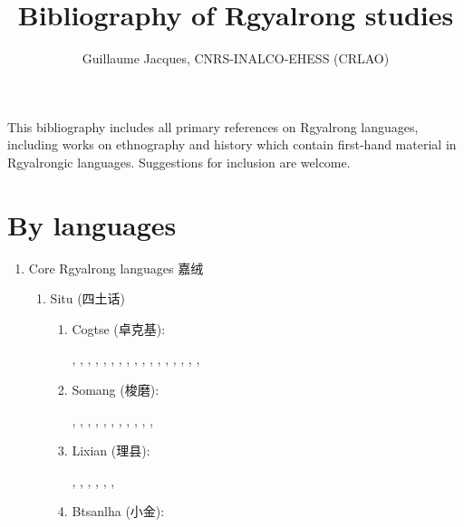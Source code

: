 \documentclass[oldfontcommands,oneside,a4paper,11pt]{article}
\newcommand{\zh}[1]{{\cn #1}}
\newcommand{\langue}[2]{#1}
\begin{document}
  \title{\langue{Bibliography of Rgyalrong studies}{Bibliographie des études rgyalrong}}
 
\author{Guillaume Jacques, CNRS-INALCO-EHESS (CRLAO)}
\maketitle
\sloppy
This bibliography includes all primary references on Rgyalrong languages, including works on ethnography and history which contain first-hand material in Rgyalrongic languages. Suggestions for inclusion are welcome.


\section{\langue{By languages}{Publications classées par langue étudiée}}
\begin{enumerate}
\item \langue{Core Rgyalrong languages \zh{嘉绒}}{Rgyalrong \zh{嘉绒}}
\begin{enumerate}
\item Situ (\zh{四土话})
\begin{enumerate}
\item Cogtse (\zh{卓克基}): 

\citet{nagano79prefixes}, \citet{nagano79rhymes}, \citet{lin83gouci}, \citet{nagano84}, \citet{linxr93jiarong}, \citet{huang93ka}, \citet{hsieh99zhuokeji}, \citet{wei01ka}, \citet{lin02dimension}, \citet{huangsun02}, \citet{youjing03zhuokeji}, \citet{nagano03cogtse}, \citet{jacques03s.houzhui}, \citet{jacksonlin07}, \citet{lin09phd}, \citet{lin11direction},  \citet{jacques12agreement}, \citet{gates12situ}

\item Somang (\zh{梭磨}): 

\citet{jin57suomo}, \citet{jin58suomo}, \citet{bauman75}, \citet{delancey81ergativity},  \citet{delancey81direction}, \citet{qu83rencheng}, \citet{dai92suomo}, \citet{linxr93jiarong}, \citet{yanmuchu05houzhui}, \citet{yanmuchu05sa}, \citet{yanmuchu06hechengci}, \citet{yanmuchu14cihui}

\item Lixian (\zh{理县}): 

\citet{wolfenden36jyarung}, \citet{wen40paslok}, \citet{jin49jyarung}, \citet{chang68gyarung}, \citet{chang75gyarung}, \citet{linxr93jiarong},

\item Btsanlha (\zh{小金}): 


\end{enumerate}
\end{enumerate}
\end{enumerate}
\end{document}
